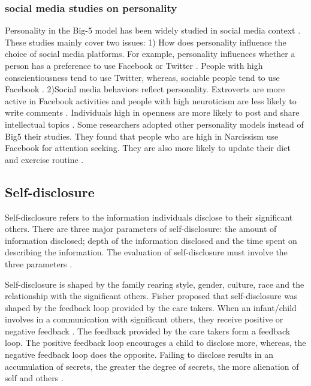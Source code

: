 \subsubsection{social media studies on personality}
Personality in the Big-5 model has been widely studied in social media context  \cite{ross_personality_2009,ma_anonymity_2016,hollenbaugh_facebook_2014,rife_participant_2016,farnadi_computational_2016,ross_personality_2009,moore_influence_2012,back_facebook_2010,seidman_self-presentation_2013,hughes_tale_2012,hong_analysis_2014,skues_effects_2012,zhang_gratifications_2011,lee_personality_2014,jenkins-guarnieri_relationships_2012,blachnio_psychological_2013,wang2013share}. These studies mainly cover two issues: 1) How does personality influence the choice of social media platforms. For example, personality influences whether a person has a preference to use Facebook or Twitter \cite{hughes_tale_2012}. People with high conscientiousness tend to use Twitter, whereas, sociable people tend to use Facebook \cite{ross_personality_2009}. 2)Social media behaviors reflect personality. Extroverts are more active in Facebook activities and people with high neuroticism are less likely to write comments \cite{skues_effects_2012}. Individuals high in openness are more likely to post and share intellectual topics \cite{marshall_big_2015}. Some researchers adopted other personality models instead of Big5 their studies. They found that people who are high in Narcissism use Facebook for attention seeking. They are also more likely to update their diet and exercise routine \cite{marshall_big_2015,andreassen_relationship_2017}. 

\subsection{Self-disclosure}
Self-disclosure refers to the information individuals disclose to their significant others. There are three major parameters of self-disclosure: the amount of information disclosed; depth of the information disclosed and the time spent on describing the information. The evaluation of self-disclosure must involve the three parameters \cite{cozby1973self}.

Self-disclosure is shaped by the family rearing style, gender, culture, race and the relationship with the significant others. Fisher proposed that self-disclosure was shaped by the feedback loop provided by the care takers. When an infant/child involves in a communication with significant others, they receive positive or negative feedback \cite{patterson2002recent}. The feedback provided by the care takers form a feedback loop. The positive feedback loop encourages a child to disclose more, whereas, the negative feedback loop does the opposite. Failing to disclose results in an accumulation of secrets, the greater the degree of secrets, the more alienation of self and others \cite{patterson2002recent}. 

